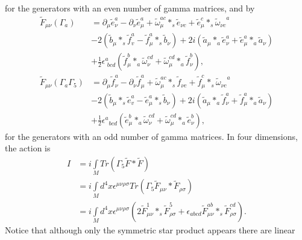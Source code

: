 \documentclass[a4paper,a4paper]{article}
\begin{document}
for the generators with an even number of gamma matrices, and by
\begin{align}
\widetilde{F}_{\mu\nu}\left(  \Gamma_{a}\right)   &  =\partial_{\mu}%
\widetilde{e}_{\nu}^{a}-\partial_{\nu}\widetilde{e}_{\mu}^{a}+\widetilde
{\omega}_{\mu}^{ac}\ast_{s}\widetilde{e}_{\nu c}+\widetilde{e}_{\mu}^{c}%
\ast_{s}\widetilde{\omega}_{\nu c}^{\quad a}\nonumber\\
&  -2\left(  \widetilde{b}_{\mu}\ast_{s}\widetilde{f}_{v}^{a}-\widetilde
{f}_{\mu}^{a}\ast_{s}\widetilde{b}_{\nu}\right)  +2i\left(  \widetilde{a}%
_{\mu}\ast_{a}\widetilde{e}_{\nu}^{a}+\widetilde{e}_{\mu}^{a}\ast
_{a}\widetilde{a}_{\nu}\right) \nonumber\\
&  +\frac{1}{2}\epsilon_{\,\,bcd}^{a}\left(  \widetilde{f}_{\mu}^{b}\ast
_{a}\widetilde{\omega}_{\nu}^{cd}+\widetilde{\omega}_{\mu}^{cd}\ast
_{a}\widetilde{f}_{\nu}^{b}\right)  ,\nonumber\\
\widetilde{F}_{\mu\nu}\left(  \Gamma_{a}\Gamma_{5}\right)   &  =\partial_{\mu
}\widetilde{f}_{\nu}^{a}-\partial_{\nu}\widetilde{f}_{\mu}^{a}+\widetilde
{\omega}_{\mu}^{ac}\ast_{s}\widetilde{f}_{\nu c}+\widetilde{f}_{\mu}^{c}%
\ast_{s}\widetilde{\omega}_{\nu c}^{\quad a}\nonumber\\
&  -2\left(  \widetilde{b}_{\mu}\ast_{s}\widetilde{e}_{v}^{a}-\widetilde
{e}_{\mu}^{a}\ast_{s}\widetilde{b}_{\nu}\right)  +2i\left(  \widetilde{a}%
_{\mu}\ast_{a}\widetilde{f}_{\nu}^{a}+\widetilde{f}_{\mu}^{a}\ast
_{a}\widetilde{a}_{\nu}\right) \nonumber\\
&  +\frac{1}{2}\epsilon_{\,\,\;bcd}^{a}\left(  \widetilde{e}_{\mu}^{b}\ast
_{a}\widetilde{\omega}_{\nu}^{cd}+\widetilde{\omega}_{\mu}^{cd}\ast
_{a}\widetilde{e}_{\nu}^{b}\right)  ,\nonumber
\end{align}
for the generators with an odd number of gamma matrices. In four dimensions,
the action is
\begin{align*}
I  &  =i\int\limits_{M}Tr\left(  \Gamma_{5}\widetilde{F}\ast\widetilde
{F}\right) \\
&  =i\int\limits_{M}d^{4}x\epsilon^{\mu\nu\rho\sigma}Tr\left(  \Gamma
_{5}\widetilde{F}_{\mu\nu}\ast\widetilde{F}_{\rho\sigma}\right) \\
&  =i\int\limits_{M}d^{4}x\epsilon^{\mu\nu\rho\sigma}\left(  2\widetilde
{F}_{\mu\nu}^{1}\ast_{s}\widetilde{F}_{\rho\sigma}^{5}+\epsilon_{abcd}%
\widetilde{F}_{\mu\nu}^{ab}\ast_{s}\widetilde{F}_{\rho\sigma}^{cd}\right)  .
\end{align*}
Notice that although only the symmetric star product appears there are linear
\end{document}
